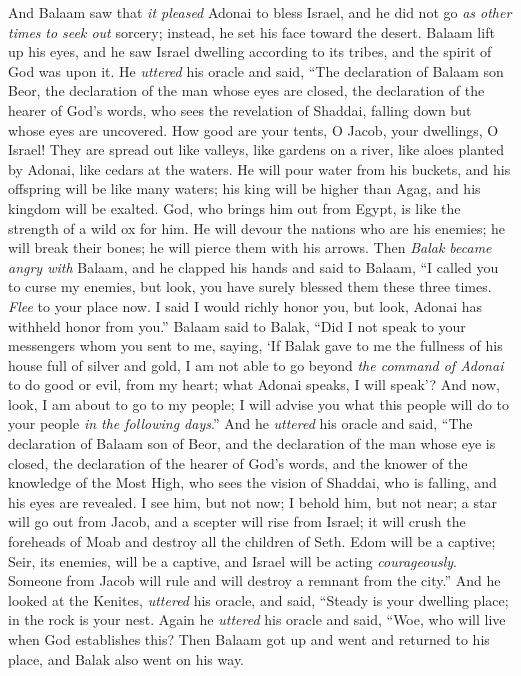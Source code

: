\begin{biblechapter} %
 And Balaam saw that \textit{it pleased} Adonai to bless Israel, and he did not go \textit{as other times} \textit{to seek out} sorcery; instead, he set his face toward the desert.
\verse Balaam lift up his eyes, and he saw Israel dwelling according to its tribes, and the spirit of God was upon it.
\verse He \textit{uttered} his oracle and said,
\verse “The declaration of Balaam son Beor, 
the declaration of the man whose eyes are closed,
\verse the declaration of the hearer of God’s words, 
who sees the revelation of Shaddai, 
falling down but whose eyes are uncovered.
\verse How good are your tents, O Jacob, 
your dwellings, O Israel!
\verse They are spread out like valleys, 
like gardens on a river, 
like aloes planted by Adonai, 
like cedars at the waters.
\verse He will pour water from his buckets, 
and his offspring will be like many waters; 
his king will be higher than Agag, 
and his kingdom will be exalted.
\verse God, who brings him out from Egypt, 
is like the strength of a wild ox for him. 
He will devour the nations who are his enemies; 
he will break their bones; 
he will pierce them with his arrows.
\verse Then \textit{Balak became angry with} Balaam, and he clapped his hands and said to Balaam, “I called you to curse my enemies, but look, you have surely blessed them these three times.
\verse \textit{Flee} to your place now. I said I would richly honor you, but look, Adonai has withheld honor from you.”
\verse Balaam said to Balak, “Did I not speak to your messengers whom you sent to me, saying,
\verse ‘If Balak gave to me the fullness of his house full of silver and gold, I am not able to go beyond \textit{the command of Adonai} to do good or evil, from my heart; what Adonai speaks, I will speak’?
\verse And now, look, I am about to go to my people; I will advise you what this people will do to your people \textit{in the following days}.”
\verse And he \textit{uttered} his oracle and said,
\verse “The declaration of Balaam son of Beor, 
and the declaration of the man whose eye is closed,
\verse the declaration of the hearer of God’s words, 
and the knower of the knowledge of the Most High, 
who sees the vision of Shaddai, 
who is falling, and his eyes are revealed.
\verse I see him, but not now; 
I behold him, but not near; 
a star will go out from Jacob, 
and a scepter will rise from Israel; 
it will crush the foreheads of Moab 
and destroy all the children of Seth.
\verse Edom will be a captive; 
Seir, its enemies, will be a captive, 
and Israel will be acting \textit{courageously}.
\verse Someone from Jacob will rule 
and will destroy a remnant from the city.”
\verse And he looked at the Kenites, \textit{uttered} his oracle, and said,
\verse “Steady is your dwelling place; 
in the rock is your nest.
\verse Again he \textit{uttered} his oracle and said,
\verse “Woe, who will live when God establishes this?
\verse Then Balaam got up and went and returned to his place, and Balak also went on his way.
\end{biblechapter}

